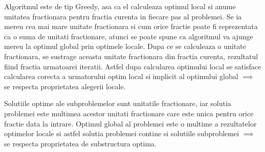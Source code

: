 \documentclass[runningheads]{llncs}
\begin{document}
Algoritmul este de tip Greedy, asa ca el calculeaza optimul local si anume unitatea fractionara pentru fractia curenta in fiecare pas al problemei.
Se ia mereu cea mai mare unitate fractionara si cum orice fractie poate fi reprezentata ca o suma de unitati fractionare, atunci se poate spune ca
algoritmul va ajunge mereu la optimul global prin optimele locale. Dupa ce se calculeaza o unitate fractionara, se sustrage aceasta unitate
fractionara din fractia curenta, rezultatul fiind fractia urmatoarei iteratii. Astfel dupa calcularea optimului local se satisface calcularea
corecta a urmatorului optim local si implicit al optimului global $\implies$ se respecta proprietatea alegerii locale.

Solutiile optime ale subproblemelor sunt unitatile fractionare, iar solutia problemei este multimea acestor unitati fractionare care este
unica pentru orice fractie data la intrare. Optimul global al problemei este o multime a rezultatelor optimelor locale si astfel solutia problemei
contine si solutiile subproblemei $\implies$ se respecta proprietatea de substructura optima.
\end{document}
